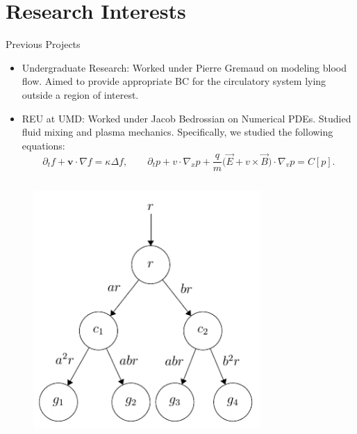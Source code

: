 \documentclass[9pt]{beamer}
\newcommand{\grad}{\nabla}
\begin{document}
\section{Research Interests}
\begin{frame}{Previous Projects}
	\begin{itemize}
		\item Undergraduate Research: Worked under Pierre Gremaud on modeling blood flow. Aimed to provide appropriate BC for the circulatory system lying outside a region of interest.
		
		\item REU at UMD: Worked under Jacob Bedrossian on Numerical PDEs. Studied fluid mixing and plasma mechanics. Specifically, we studied the following equations:
		$$
			\partial_t f + \textbf{v}\cdot \grad f = \kappa \Delta f, \quad\quad 
			\partial_t p + v\cdot \grad_x p + \frac{q}{m}\big(\overrightarrow{E} + v\times \overrightarrow{B}\big)\cdot \grad_v p = C[p].
		$$
	\end{itemize}
	\begin{columns}
		\begin{column}{2cm}
			\begin{figure}
				\includegraphics[scale=0.375]{Tree.png}
			\end{figure}
		\end{column}
		\begin{column}{7cm}
			\begin{figure}
					\centering

\end{figure}
\end{column}
\end{columns}
\end{frame}
\end{document}
